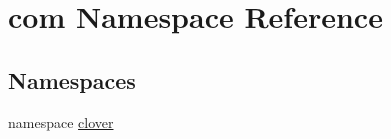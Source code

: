 \hypertarget{namespacecom}{}\section{com Namespace Reference}
\label{namespacecom}
\subsection*{Namespaces}
\begin{DoxyCompactItemize}
\item 
namespace \hyperlink{namespacecom_1_1clover}{clover}
\end{DoxyCompactItemize}
